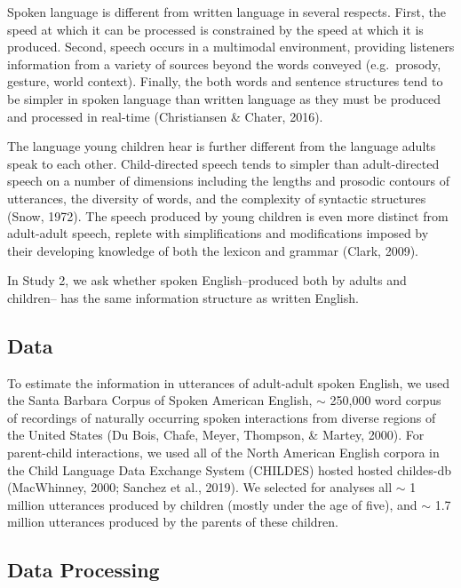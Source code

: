 \documentclass[10pt, letterpaper]{article}
\begin{document}
Spoken language is different from written language in several respects.
First, the speed at which it can be processed is constrained by the
speed at which it is produced. Second, speech occurs in a multimodal
environment, providing listeners information from a variety of sources
beyond the words conveyed (e.g.~prosody, gesture, world context).
Finally, the both words and sentence structures tend to be simpler in
spoken language than written language as they must be produced and
processed in real-time (Christiansen \& Chater, 2016).

The language young children hear is further different from the language
adults speak to each other. Child-directed speech tends to simpler than
adult-directed speech on a number of dimensions including the lengths
and prosodic contours of utterances, the diversity of words, and the
complexity of syntactic structures (Snow, 1972). The speech produced by
young children is even more distinct from adult-adult speech, replete
with simplifications and modifications imposed by their developing
knowledge of both the lexicon and grammar (Clark, 2009).

In Study 2, we ask whether spoken English--produced both by adults and
children-- has the same information structure as written English.

\hypertarget{data-1}{%
\subsection{Data}\label{data-1}}

To estimate the information in utterances of adult-adult spoken English,
we used the Santa Barbara Corpus of Spoken American English, \(\sim\)
250,000 word corpus of recordings of naturally occurring spoken
interactions from diverse regions of the United States (Du Bois, Chafe,
Meyer, Thompson, \& Martey, 2000). For parent-child interactions, we
used all of the North American English corpora in the Child Language
Data Exchange System (CHILDES) hosted hosted childes-db (MacWhinney,
2000; Sanchez et al., 2019). We selected for analyses all \(\sim\) 1
million utterances produced by children (mostly under the age of five),
and \(\sim\) 1.7 million utterances produced by the parents of these
children.

\hypertarget{data-processing}{%
\subsection{Data Processing}\label{data-processing}}
\end{document}
